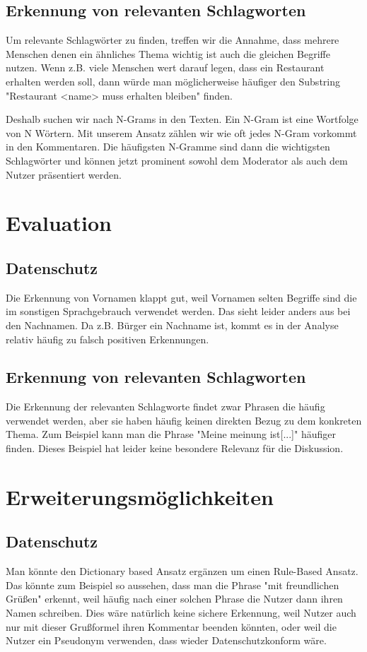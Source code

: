 \documentclass[runningheads]{llncs}
\begin{document}
\subsection{Erkennung von relevanten Schlagworten}
Um relevante Schlagwörter zu finden, treffen wir die Annahme, dass mehrere Menschen denen ein ähnliches Thema wichtig ist auch die gleichen Begriffe nutzen.
Wenn z.B. viele Menschen wert darauf legen, dass ein Restaurant erhalten werden soll, dann würde man möglicherweise häufiger den Substring "Restaurant <name> muss erhalten bleiben" finden.

Deshalb suchen wir nach N-Grams in den Texten.
Ein N-Gram ist eine Wortfolge von N Wörtern.
Mit unserem Ansatz zählen wir wie oft jedes N-Gram vorkommt in den Kommentaren.
Die häufigsten N-Gramme sind dann die wichtigsten Schlagwörter und können jetzt prominent sowohl dem Moderator als auch dem Nutzer präsentiert werden.
\section{Evaluation}
\subsection{Datenschutz}
Die Erkennung von Vornamen klappt gut, weil Vornamen selten Begriffe sind die im sonstigen Sprachgebrauch verwendet werden.
Das sieht leider anders aus bei den Nachnamen.
Da z.B. Bürger ein Nachname ist, kommt es in der Analyse relativ häufig zu falsch positiven Erkennungen.
\subsection{Erkennung von relevanten Schlagworten}
Die Erkennung der relevanten Schlagworte findet zwar Phrasen die häufig verwendet werden, aber sie haben häufig keinen direkten Bezug zu dem konkreten Thema.
Zum Beispiel kann man die Phrase "Meine meinung ist[...]" häufiger finden.
Dieses Beispiel hat leider keine besondere Relevanz für die Diskussion.
\section{Erweiterungsmöglichkeiten}
\subsection{Datenschutz}
Man könnte den Dictionary based Ansatz ergänzen um einen Rule-Based Ansatz.
Das könnte zum Beispiel so aussehen, dass man die Phrase "mit freundlichen Grüßen" erkennt, weil häufig nach einer solchen Phrase die Nutzer dann ihren Namen schreiben.
Dies wäre natürlich keine sichere Erkennung, weil Nutzer auch nur mit dieser Grußformel ihren Kommentar beenden könnten, oder weil die Nutzer ein Pseudonym verwenden, dass wieder Datenschutzkonform wäre.
\end{document}
